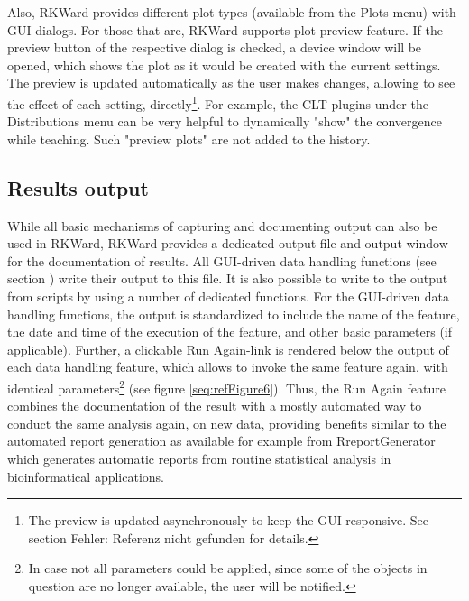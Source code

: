 Also, RKWard provides different plot types (available from the Plots
menu) with GUI dialogs. For those that are, RKWard supports plot
preview feature. If the preview button of
the respective dialog is checked, a device window will be opened, which
shows the plot as it would be created with the current settings. The
preview is updated automatically as the user makes changes, allowing to
see the effect of each setting, directly\footnote{The preview is
updated asynchronously to keep the GUI responsive. See section Fehler:
Referenz nicht gefunden for details.}. For example, the CLT plugins
under the Distributions menu can be very helpful to dynamically "show"
the convergence while teaching. Such "preview plots" are not added to
the history.

\subsection{Results output}
\label{sec:results_output}

While all basic mechanisms of
capturing and documenting  output can also
be used in RKWard, RKWard provides a dedicated output file and output
window for the documentation of results. All GUI-driven data handling
functions (see section ) write their output to this file. It is also
possible to write to the output from 
scripts by using a number of dedicated 
functions. For the GUI-driven data handling functions, the output is
standardized to include the name of the feature, the date and time of
the execution of the feature, and other basic parameters (if
applicable). Further, a clickable Run
Again-link is rendered below the output of each data
handling feature, which allows to invoke the same feature again, with
identical parameters\footnote{In case not all parameters could be
applied, since some of the  objects in
question are no longer available, the user will be notified.} (see
figure \ref{seq:refFigure6}). Thus, the Run
Again feature combines the documentation of the result
with a mostly automated way to conduct the same analysis again, on new
data, providing benefits similar to the automated report generation as
available for example from RreportGenerator
\citep{RaffelsbergerW2008} which generates automatic
reports from routine statistical analysis in bioinformatical
applications.

